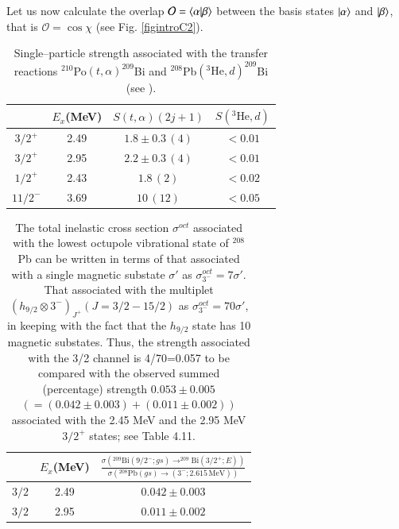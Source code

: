 Let us now calculate the overlap $\mathcal O=\langle {\alpha|\beta} \rangle$ between the basis states $|{\alpha} \rangle$ and $|{\beta} \rangle$, that is $\mathcal O=\cos\chi$ (see Fig. \ref{figintroC2}).   
\begin{table}
\begin{tabular}{|c|c|c|c|}
\hline 
 & $E_x$(MeV) & $S(t,\alpha)(2j+1)$ & $S(^3\text{He},d)$ \\
 \hline 
$3/2^+$ & 2.49 & $1.8\pm0.3\,(4)$  & $<0.01$  \\ 
$3/2^+$ & 2.95 & $2.2\pm0.3\,(4)$  & $<0.01$ \\ 
 $1/2^+$& 2.43 &  $1.8\,(2)$& $<0.02$ \\ 
 $11/2^-$& 3.69 & $10\,(12)$ &  $<0.05$\\ 
 \hline
\end{tabular}\caption{Single--particle strength associated with the  transfer reactions  $^{210}$Po$(t,\alpha)^{209}$Bi and $^{208}$Pb$(^3\text{He},d)^{209}$Bi (see \cite{Bortignon:77}).}\label{tabintroC1}
\end{table}
\begin{table}
\begin{tabular}{|c|c|c|}
\hline 
 & $E_x$(MeV) & $\frac{\sigma\left(^{209}\text{Bi}(9/2^-;gs)\rightarrow^{209}\text{Bi}(3/2^+;E)\right)}{\sigma\left(^{208}\text{Pb}(gs)\rightarrow (3^-;2.615\, \text{MeV})\right)}$  \\
 \hline 
$3/2$ & 2.49 & $0.042\pm0.003$   \\ 
$3/2$ & 2.95 & $0.011\pm0.002$  \\ 
 \hline
\end{tabular}\caption{The total inelastic cross section $\sigma^{oct}$ associated with the lowest octupole vibrational state of $^{208}$Pb can be written in terms of that associated with a single magnetic substate $\sigma'$ as $\sigma_{3^-}^{oct}=7\sigma'$. That associated with the multiplet $(h_{9/2}\otimes 3^-)_{J^+} (J=3/2-15/2)$ as $\sigma_{3^-}^{oct}=70\sigma'$, in keeping with the fact that the $h_{9/2}$ state has 10 magnetic substates. Thus, the strength associated with the 3/2 channel is 4/70=0.057 to be compared with the observed summed (percentage) strength $0.053\pm0.005 $ $(=(0.042\pm0.003)+(0.011\pm0.002))$ associated with the 2.45 MeV and the 2.95 MeV $3/2^+$ states; see \cite{Bortignon:77} Table 4.11.}\label{tabintroC2}
\end{table}
